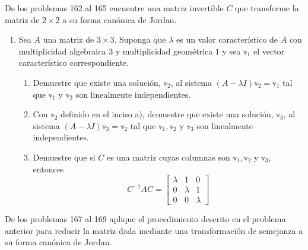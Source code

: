 De los problemas 162 al 165 encuentre una matriz invertible $C$ que transforme la matriz de $2 \times 2$ a su forma canónica de Jordan.
\begin{multienumerate}
    \setcounter{multienumi}{161}
\end{multienumerate}
\begin{enumerate}[start=166]
    \item Sea $A$ una matriz de $3 \times 3$. Suponga que $\lambda$ es un valor característico de $A$ con multiplicidad algebraica $3$ y multiplicidad geométrica $1$ y sea $\mathbb{v}_{1}$ el vector característico correspondiente.
    \begin{enumerate}
        \item Demuestre que existe una solución, $\mathbb{v}_{2}$, al sistema $(A-\lambda I) \mathbb{v}_{2}=\mathbb{v}_{1}$ tal que $\mathbb{v}_{1}$ y $\mathbb{v}_{2}$ son linealmente independientes.
        \item Con $\mathbb{v}_{2}$ definido en el inciso a), demuestre que existe una solución, $\mathbb{v}_{3}$, al sistema $(A-\lambda I) \mathbb{v}_{3}=\mathbb{v}_{2}$ tal que $\mathbb{v}_{1}, \mathbb{v}_{2}$ y $\mathbb{v}_{3}$ son linealmente independientes.
        \item Demuestre que si $C$ es una matriz cuyas columnas son $\mathbb{v}_{1}, \mathbb{v}_{2}$ y $\mathbb{v}_{3}$, entonces
        $$C^{-1} A C=\begin{bmatrix*}
            \lambda & 1 & 0 \\
            0 & \lambda & 1 \\
            0 & 0 & \lambda
        \end{bmatrix*}$$
    \end{enumerate}
\end{enumerate}
De los problemas 167 al 169 aplique el procedimiento descrito en el problema anterior para reducir la matriz dada mediante una transformación de semejanza a su forma canónica de Jordan.

